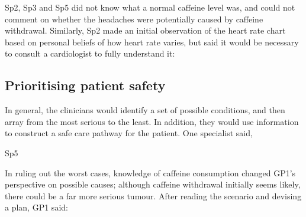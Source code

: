 \documentclass{sigchi}
\begin{document}
Sp2, Sp3 and Sp5 did not know what a normal caffeine level was, and could not comment on whether the headaches were potentially caused by caffeine withdrawal. Similarly, Sp2 made an initial observation of the heart rate chart based on personal beliefs of how heart rate varies, but said it would be necessary to consult a cardiologist to fully understand it:


\subsection{Prioritising patient safety}

In general, the clinicians would identify a set of possible conditions, and then array from the most serious to the least.  In addition, they would use information to construct a safe care pathway for the patient.  One specialist said,





 {Sp5}



In ruling out the worst cases, knowledge of caffeine consumption changed GP1's perspective on possible causes; although caffeine withdrawal initially seems likely, there could be a far more serious tumour. After reading the scenario and devising a plan, GP1 said:
\end{document}
